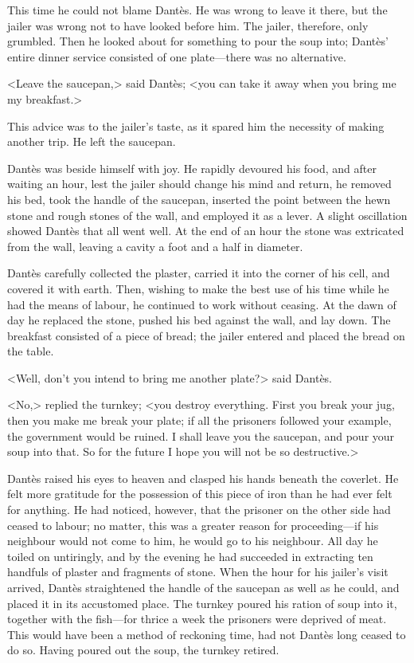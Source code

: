  This time he could not blame Dantès. He was wrong to leave it there, but the jailer was wrong not to have looked before him. The jailer, therefore, only grumbled. Then he looked about for something to pour the soup into; Dantès' entire dinner service consisted of one plate—there was no alternative. 

 <Leave the saucepan,> said Dantès; <you can take it away when you bring me my breakfast.> 

 This advice was to the jailer's taste, as it spared him the necessity of making another trip. He left the saucepan. 

 Dantès was beside himself with joy. He rapidly devoured his food, and after waiting an hour, lest the jailer should change his mind and return, he removed his bed, took the handle of the saucepan, inserted the point between the hewn stone and rough stones of the wall, and employed it as a lever. A slight oscillation showed Dantès that all went well. At the end of an hour the stone was extricated from the wall, leaving a cavity a foot and a half in diameter. 

 Dantès carefully collected the plaster, carried it into the corner of his cell, and covered it with earth. Then, wishing to make the best use of his time while he had the means of labour, he continued to work without ceasing. At the dawn of day he replaced the stone, pushed his bed against the wall, and lay down. The breakfast consisted of a piece of bread; the jailer entered and placed the bread on the table. 

 <Well, don't you intend to bring me another plate?> said Dantès. 

 <No,> replied the turnkey; <you destroy everything. First you break your jug, then you make me break your plate; if all the prisoners followed your example, the government would be ruined. I shall leave you the saucepan, and pour your soup into that. So for the future I hope you will not be so destructive.> 

 Dantès raised his eyes to heaven and clasped his hands beneath the coverlet. He felt more gratitude for the possession of this piece of iron than he had ever felt for anything. He had noticed, however, that the prisoner on the other side had ceased to labour; no matter, this was a greater reason for proceeding—if his neighbour would not come to him, he would go to his neighbour. All day he toiled on untiringly, and by the evening he had succeeded in extracting ten handfuls of plaster and fragments of stone. When the hour for his jailer's visit arrived, Dantès straightened the handle of the saucepan as well as he could, and placed it in its accustomed place. The turnkey poured his ration of soup into it, together with the fish—for thrice a week the prisoners were deprived of meat. This would have been a method of reckoning time, had not Dantès long ceased to do so. Having poured out the soup, the turnkey retired. 

